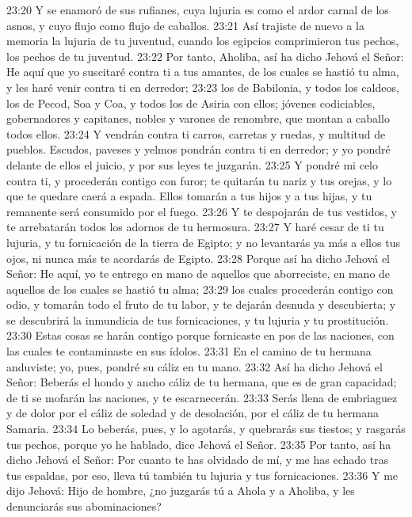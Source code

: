 23:20 Y se enamoró de sus rufianes, cuya lujuria es como el ardor carnal de los asnos, y cuyo flujo como flujo de caballos.  
23:21 Así trajiste de nuevo a la memoria la lujuria de tu juventud, cuando los egipcios comprimieron tus pechos, los pechos de tu juventud.  
23:22 Por tanto, Aholiba, así ha dicho Jehová el Señor: He aquí que yo suscitaré contra ti a tus amantes, de los cuales se hastió tu alma, y les haré venir contra ti en derredor;  
23:23 los de Babilonia, y todos los caldeos, los de Pecod, Soa y Coa, y todos los de Asiria con ellos; jóvenes codiciables, gobernadores y capitanes, nobles y varones de renombre, que montan a caballo todos ellos.  
23:24 Y vendrán contra ti carros, carretas y ruedas, y multitud de pueblos. Escudos, paveses y yelmos pondrán contra ti en derredor; y yo pondré delante de ellos el juicio, y por sus leyes te juzgarán.  
23:25 Y pondré mi celo contra ti, y procederán contigo con furor; te quitarán tu nariz y tus orejas, y lo que te quedare caerá a espada. Ellos tomarán a tus hijos y a tus hijas, y tu remanente será consumido por el fuego.  
23:26 Y te despojarán de tus vestidos, y te arrebatarán todos los adornos de tu hermosura.  
23:27 Y haré cesar de ti tu lujuria, y tu fornicación de la tierra de Egipto; y no levantarás ya más a ellos tus ojos, ni nunca más te acordarás de Egipto.  
23:28 Porque así ha dicho Jehová el Señor: He aquí, yo te entrego en mano de aquellos que aborreciste, en mano de aquellos de los cuales se hastió tu alma;  
23:29 los cuales procederán contigo con odio, y tomarán todo el fruto de tu labor, y te dejarán desnuda y descubierta; y se descubrirá la inmundicia de tus fornicaciones, y tu lujuria y tu prostitución.  
23:30 Estas cosas se harán contigo porque fornicaste en pos de las naciones, con las cuales te contaminaste en sus ídolos.  
23:31 En el camino de tu hermana anduviste; yo, pues, pondré su cáliz en tu mano.  
23:32 Así ha dicho Jehová el Señor: Beberás el hondo y ancho cáliz de tu hermana, que es de gran capacidad; de ti se mofarán las naciones, y te escarnecerán.  
23:33 Serás llena de embriaguez y de dolor por el cáliz de soledad y de desolación, por el cáliz de tu hermana Samaria.  
23:34 Lo beberás, pues, y lo agotarás, y quebrarás sus tiestos; y rasgarás tus pechos, porque yo he hablado, dice Jehová el Señor.  
23:35 Por tanto, así ha dicho Jehová el Señor: Por cuanto te has olvidado de mí, y me has echado tras tus espaldas, por eso, lleva tú también tu lujuria y tus fornicaciones.  
23:36 Y me dijo Jehová: Hijo de hombre, ¿no juzgarás tú a Ahola y a Aholiba, y les denunciarás sus abominaciones?  
